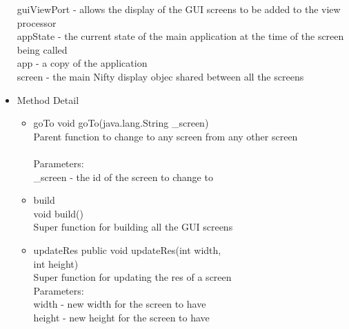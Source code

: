 \documentclass[letterpaper]{article}
\begin{document}
\begin{itemize}
												guiViewPort - allows the display of the GUI screens to be added to the view processor \\
												appState - the current state of the main application at the time of the screen being called \\
												app - a copy of the application \\
												screen - the main Nifty display objec shared between all the screens \\
										\item	Method Detail
												\begin{itemize}
		\item goTo 
		void goTo(java.lang.String \_screen) \\
		Parent function to change to any screen from any other screen \\ \\
		Parameters: \\
		        \_screen - the id of the screen to change to \\
		
		
													\item	
		    build \\
		    void build() \\
		
		    Super function for building all the GUI screens \\
		    \item updateRes
		    public void updateRes(int width, \\
		                 int height) \\
		    Super function for updating the res of a screen \\
		    Parameters: \\
		        width - new width for the screen to have \\
		        height - new height for the screen to have \\
		
		 
		
												\end{itemize}
									\end{itemize}
									
\end{document}
